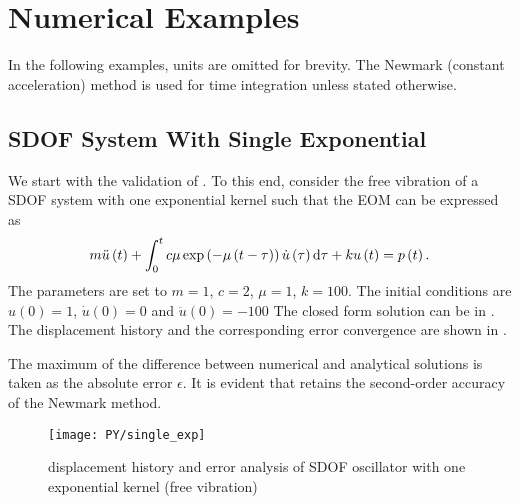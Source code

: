 \section{Numerical Examples}\label{sec:example}
In the following examples, units are omitted for brevity.
The Newmark (constant acceleration) method is used for time integration unless stated otherwise.
\subsection{SDOF System With Single Exponential}
We start with the validation of . To this end, consider the free vibration of a SDOF system with one exponential kernel such that the EOM can be expressed as
\begin{gather}
m\ddot{u}\left(t\right)+\int_0^tc\mu\exp\left(-\mu\left(t-\tau\right)\right)\dot{u}\left(\tau\right)\mathrm{d}\tau+ku\left(t\right)=p\left(t\right).
\end{gather}
The parameters are set to $m=1$, $c=2$, $\mu=1$, $k=100$.
The initial conditions are $u\left(0\right)=1$, $\dot{u}\left(0\right)=0$ and $\ddot{u}\left(0\right)=-100$ The  closed form solution can be  in .
The displacement history and the corresponding error convergence are shown in .

The maximum of the difference between numerical and analytical solutions is taken as the absolute error $\epsilon$. It is evident that  retains the second-order accuracy of the Newmark method.
\begin{figure}[H]
\centering
\texttt{[image: PY/single\_exp]}
\caption{displacement history and error analysis of SDOF oscillator with one exponential kernel (free vibration)}\label{fig:sdof}
\end{figure}

